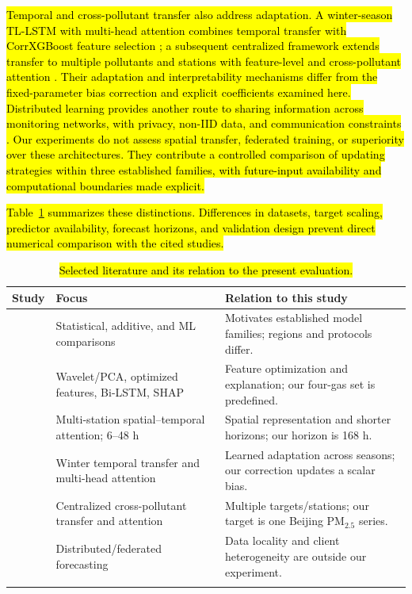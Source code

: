 \documentclass[pdflatex,sn-basic,Numbered]{sn-jnl}
\newcommand{\rev}[1]{\hl{#1}}
\begin{document}
\rev{Temporal and cross-pollutant transfer also address adaptation. A winter-season TL-LSTM with multi-head attention combines temporal transfer with CorrXGBoost feature selection \citep{revWinter}; a subsequent centralized framework extends transfer to multiple pollutants and stations with feature-level and cross-pollutant attention \citep{revCrossPollutant}. Their adaptation and interpretability mechanisms differ from the fixed-parameter bias correction and explicit coefficients examined here. Distributed learning provides another route to sharing information across monitoring networks, with privacy, non-IID data, and communication constraints \citep{bib30,bib4}. Our experiments do not assess spatial transfer, federated training, or superiority over these architectures. They contribute a controlled comparison of updating strategies within three established families, with future-input availability and computational boundaries made explicit.}

\rev{Table~\ref{tab:lr} summarizes these distinctions. Differences in datasets, target scaling, predictor availability, forecast horizons, and validation design prevent direct numerical comparison with the cited studies.}

\begin{table}[htbp]
\caption{\rev{Selected literature and its relation to the present evaluation.}}
\label{tab:lr}
\begingroup\small\setlength{\tabcolsep}{4pt}
\begin{tabularx}{\linewidth}{@{}l>{\raggedright\arraybackslash}X>{\raggedright\arraybackslash}X@{}}
\toprule
Study & Focus & Relation to this study \\
\midrule
\citep{bib14,bib15} & Statistical, additive, and ML comparisons & Motivates established model families; regions and protocols differ. \\
\citep{revWavelet} & Wavelet/PCA, optimized features, Bi-LSTM, SHAP & Feature optimization and explanation; our four-gas set is predefined. \\
\citep{revSTA} & Multi-station spatial--temporal attention; 6--48 h & Spatial representation and shorter horizons; our horizon is 168 h. \\
\citep{revWinter} & Winter temporal transfer and multi-head attention & Learned adaptation across seasons; our correction updates a scalar bias. \\
\citep{revCrossPollutant} & Centralized cross-pollutant transfer and attention & Multiple targets/stations; our target is one Beijing PM$_{2.5}$ series. \\
\citep{bib30} & Distributed/federated forecasting & Data locality and client heterogeneity are outside our experiment. \\
\botrule
\end{tabularx}\endgroup
\end{table}
\end{document}
